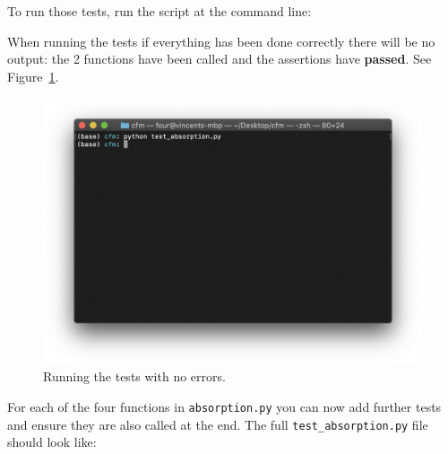 To run those tests, run the script at the command line:



When running the tests if everything has been done correctly there will be no
output: the 2 functions have been called and the assertions have
\textbf{passed}. See Figure~\ref{fig:running_tests_with_no_errors}.

\begin{figure}[htbp]
\centering

\includegraphics[width=0.750\linewidth]{./assets/running_tests_with_no_errors/main.png}
\caption{Running the tests with no errors.}
\label{fig:running_tests_with_no_errors}
\end{figure}


For each of the four functions in \texttt{absorption.py} you can now add further tests
and ensure they are also called at the end. The full \texttt{test\_absorption.py} file
should look like:

